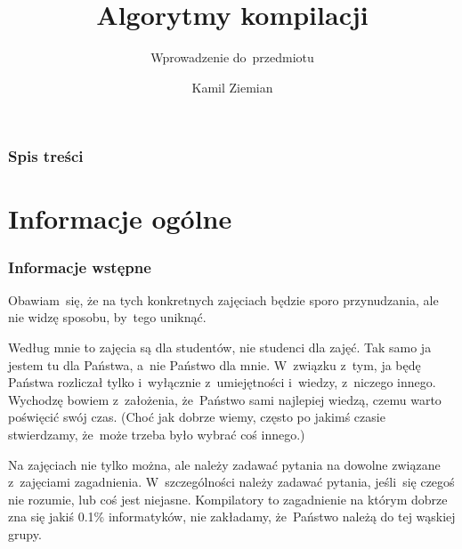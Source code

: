 \documentclass[10pt,t]{beamer}
\title{Algorytmy kompilacji}
\subtitle{Wprowadzenie do~przedmiotu}
\author{Kamil Ziemian \\
  \email}
\begin{document}





\RaggedRight





\maketitle





\begin{frame}
  \frametitle{Spis treści}


  \tableofcontents

\end{frame}





\section{Informacje ogólne}





\begin{frame}
  \frametitle{Informacje wstępne}


  Obawiam~się, że na tych konkretnych zajęciach będzie sporo przynudzania,
  ale nie widzę sposobu, by~tego uniknąć.

  Według mnie to zajęcia są dla studentów, nie studenci dla zajęć. Tak samo
  ja jestem tu dla Państwa, a~nie Państwo dla mnie. W~związku z~tym, ja
  będę Państwa rozliczał tylko i~wyłącznie z~umiejętności i~wiedzy,
  z~niczego innego. Wychodzę bowiem z~założenia, że~Państwo sami najlepiej
  wiedzą, czemu warto poświęcić swój czas. (Choć jak dobrze wiemy, często
  po jakimś czasie stwierdzamy, że~może trzeba było wybrać coś innego.)

  Na zajęciach nie tylko można, ale \alert{należy} zadawać pytania
  na dowolne związane z~zajęciami zagadnienia. W~szczególności
  \alert{należy} zadawać pytania, jeśli~się czegoś nie rozumie, lub coś
  jest niejasne. Kompilatory to zagadnienie na którym dobrze zna się jakiś
  0.1\% informatyków, \alert{nie} zakładamy, że~Państwo należą do tej
  wąskiej grupy.

\end{frame}
\end{document}
